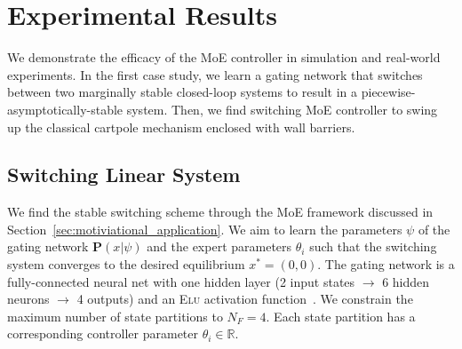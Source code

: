 \section{Experimental Results}
\label{sec:moe_results}

We demonstrate the efficacy of the MoE controller in simulation
and real-world experiments.
%
In the first case study, we learn a gating network that switches between two
marginally stable closed-loop systems to result in a
piecewise-asymptotically-stable system.
%
Then, we find switching MoE controller to swing up the classical cartpole
mechanism enclosed with wall barriers.
%

\subsection{Switching Linear System}

We find the stable switching scheme through the MoE framework discussed in
Section~\ref{sec:motiviational_application}.
%
We aim to learn the parameters $\psi$ of the gating network $\mathbf{P}(x|
\psi)$ and the expert parameters $\theta_i$ such that the switching system
converges to the desired equilibrium $x^* = (0, 0)$.
%
The gating network is a fully-connected neural net with one hidden layer (2 input states 
$\rightarrow$ 6 hidden neurons $\rightarrow$ 4 outputs) and an \textsc{Elu} activation
function~\cite{clevert2015fast}.
%
We constrain the maximum number of state partitions to $N_F=4$.
%
Each state partition has a corresponding controller parameter $\theta_i \in
\mathbb{R}$. 
%

